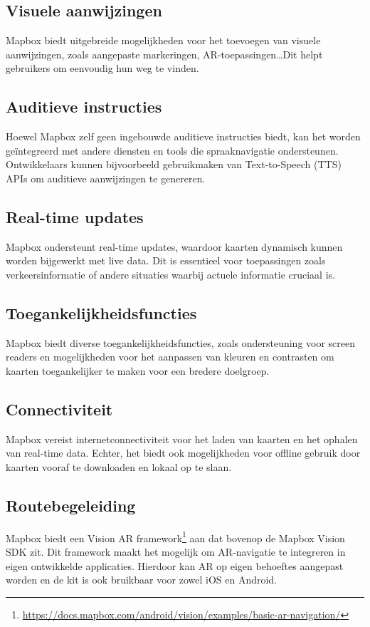 \subsection*{Visuele aanwijzingen}
Mapbox biedt uitgebreide mogelijkheden voor het toevoegen van visuele aanwijzingen, zoals aangepaste markeringen, AR-toepassingen\ldots Dit helpt gebruikers om eenvoudig hun weg te vinden.

\subsection*{Auditieve instructies}
Hoewel Mapbox zelf geen ingebouwde auditieve instructies biedt, kan het worden geïntegreerd met andere diensten en tools die spraaknavigatie ondersteunen. Ontwikkelaars kunnen bijvoorbeeld gebruikmaken van Text-to-Speech (TTS) APIs om auditieve aanwijzingen te genereren.

\subsection*{Real-time updates}
Mapbox ondersteunt real-time updates, waardoor kaarten dynamisch kunnen worden bijgewerkt met live data. Dit is essentieel voor toepassingen zoals verkeersinformatie of andere situaties waarbij actuele informatie cruciaal is.

\subsection*{Toegankelijkheidsfuncties}
Mapbox biedt diverse toegankelijkheidsfuncties, zoals ondersteuning voor screen readers en mogelijkheden voor het aanpassen van kleuren en contrasten om kaarten toegankelijker te maken voor een bredere doelgroep. 

\subsection*{Connectiviteit}
Mapbox vereist internetconnectiviteit voor het laden van kaarten en het ophalen van real-time data. Echter, het biedt ook mogelijkheden voor offline gebruik door kaarten vooraf te downloaden en lokaal op te slaan.

\subsection*{Routebegeleiding}
Mapbox biedt een Vision AR framework\footnote{\url{https://docs.mapbox.com/android/vision/examples/basic-ar-navigation/}} aan dat bovenop de Mapbox Vision SDK zit. Dit framework maakt het mogelijk om AR-navigatie te integreren in eigen ontwikkelde applicaties. Hierdoor kan AR op eigen behoeftes aangepast worden en de kit is ook bruikbaar voor zowel iOS en Android.

